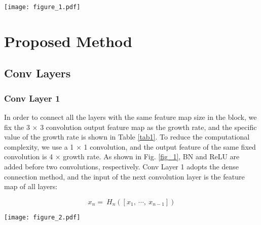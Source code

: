\documentclass[default,iicol]{sn-jnl}
\theoremstyle{thmstyleone}\newtheorem{theorem}{Theorem}\newtheorem{proposition}[theorem]{Proposition}
\theoremstyle{thmstyletwo}\newtheorem{example}{Example}\newtheorem{remark}{Remark}
\theoremstyle{thmstylethree}\newtheorem{definition}{Definition}
\begin{document}
\begin{figure*}[h]
  \centering
  \texttt{[image: figure\_1.pdf]}
  \caption{Three convolution layers are used by TripleNet: (a) Conv Layer 1, using dense connections, (b) Conv Layer 2, using harmonic dense connections, (c) Conv Layer 3, using residual learning.}
  \label{fig_1}
\end{figure*}

\section{Proposed Method}
\subsection{Conv Layers}
\subsubsection{Conv Layer 1}
In order to connect all the layers with the same feature map size in the block, we fix the 3 × 3 convolution output feature map as the growth rate, and the specific value of the growth rate is shown in Table \ref{tab1}. To reduce the computational complexity, we use a 1 × 1 convolution, and the output feature of the same fixed convolution is 4 × growth rate. As shown in Fig. \ref{fig_1}, BN \cite{ioffe2015batch} and ReLU \cite{glorot2011deep} are added before two convolutions, respectively. Conv Layer 1 adopts the dense connection method, and the input of the next convolution layer is the feature map of all layers:

\begin{equation}
x_n=\ H_n\left(\left[x_1,\ \cdots,\ x_{n-1}\right]\right)
\label{eq1}
\end{equation}

\begin{algorithm}
\caption{Conv Layer 2}
\label{algo}
\begin{algorithmic}[1]
    \EndFor
\EndFor
{}
\EndFor
\end{algorithmic}
\end{algorithm}

\begin{figure*}[h]
  \centering
  \texttt{[image: figure\_2.pdf]}
  \caption{The overall architecture of TripleNet.}
  \label{fig_2}
\end{figure*}
\end{document}
